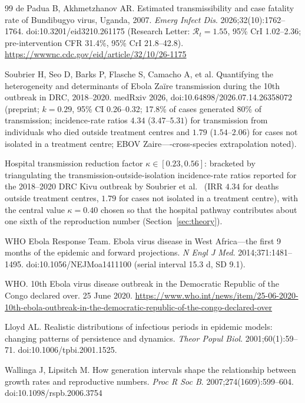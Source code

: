 \documentclass[preprint,12pt,numbers]{elsarticle}
\newcommand{\Reff}{\mathcal{R}}
\begin{document}
\begin{thebibliography}{99}
 de Padua B, Akhmetzhanov AR. Estimated
transmissibility and case fatality rate of Bundibugyo virus, Uganda,
2007. \emph{Emerg Infect Dis}. 2026;32(10):1762--1764.
doi:10.3201/eid3210.261175 (Research Letter: $\Reff_t=1.55$, 95\% CrI
1.02--2.36; pre-intervention CFR 31.4\%, 95\% CrI 21.8--42.8).
\url{https://wwwnc.cdc.gov/eid/article/32/10/26-1175}

 Soubrier H, Seo D, Barks P, Flasche S, Camacho A,
et al. Quantifying the heterogeneity and determinants of Ebola Za\"ire
transmission during the 10th outbreak in DRC, 2018--2020. medRxiv
2026, doi:10.64898/2026.07.14.26358072 (preprint; $k=0.29$, 95\% CI
0.26--0.32; 17.8\% of cases generated 80\% of transmission; incidence-rate
ratios $4.34$ ($3.47$--$5.31$) for transmission from individuals who died
outside treatment centres and $1.79$ ($1.54$--$2.06$) for cases not
isolated in a treatment centre; EBOV Zaire----cross-species extrapolation
noted).

 Hospital transmission reduction factor
$\kappa\in[0.23,0.56]$: bracketed by triangulating the
transmission-outside-isolation incidence-rate ratios reported for the
2018--2020 DRC Kivu outbreak by Soubrier et al.\ \cite{Soubrier2026}
(IRR $4.34$ for deaths outside treatment centres, $1.79$ for cases not
isolated in a treatment centre), with the central value $\kappa=0.40$
chosen so that the hospital pathway contributes about one sixth of the
reproduction number (Section~\ref{sec:theory}).

 WHO Ebola Response Team. Ebola virus
disease in West Africa---the first 9 months of the epidemic and forward
projections. \emph{N Engl J Med}. 2014;371:1481--1495.
doi:10.1056/NEJMoa1411100 (serial interval 15.3 d, SD 9.1).

 WHO. 10th Ebola virus disease outbreak in the
Democratic Republic of the Congo declared over. 25 June 2020.
\url{https://www.who.int/news/item/25-06-2020-10th-ebola-outbreak-in-the-democratic-republic-of-the-congo-declared-over}

 Lloyd AL. Realistic distributions of infectious
periods in epidemic models: changing patterns of persistence and
dynamics. \emph{Theor Popul Biol}. 2001;60(1):59--71.
doi:10.1006/tpbi.2001.1525.

 Wallinga J, Lipsitch M. How generation intervals
shape the relationship between growth rates and reproductive numbers.
\emph{Proc R Soc B}. 2007;274(1609):599--604. doi:10.1098/rspb.2006.3754


\end{thebibliography}
\end{document}
